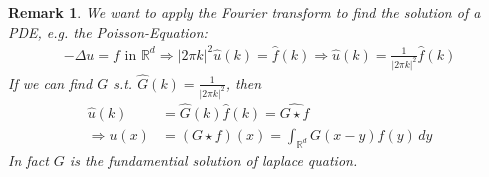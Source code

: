 \documentclass{report}
\theoremstyle{tommy}
\newtheorem{rem}[defn]{Remark}
\newtheorem{ex}[defn]{Exercise}
\newcommand{\Rd}{\mathbb{R}^d}
\begin{document}
  
    

    \begin{rem}
      We want to apply the Fourier transform to find the solution of a PDE, e.g. the Poisson-Equation:
      \begin{align*}
        - \Delta u = f \text{ in } \mathbb{R}^d
        \Rightarrow | 2 \pi k|^2 \hat u (k) = \hat f(k)
        \Rightarrow \hat u(k) = \frac{1}{|2 \pi k|^2} \hat f(k) 
      \end{align*}
      If we can find \(G\) s.t. \(\hat G(k)  = \frac{1}{|2 \pi k|^2}\), then
      \begin{align*}
        \hat u(k) &= \hat G(k) \hat f(k) = \widehat{G \star f} \\
        \Rightarrow u(x) &= (G \star f) (x) = \int_{\Rd} G(x-y)f(y)\, dy
      \end{align*}
      In fact \(G\) is the fundamential solution of laplace quation.
  \end{rem}
\end{document}
